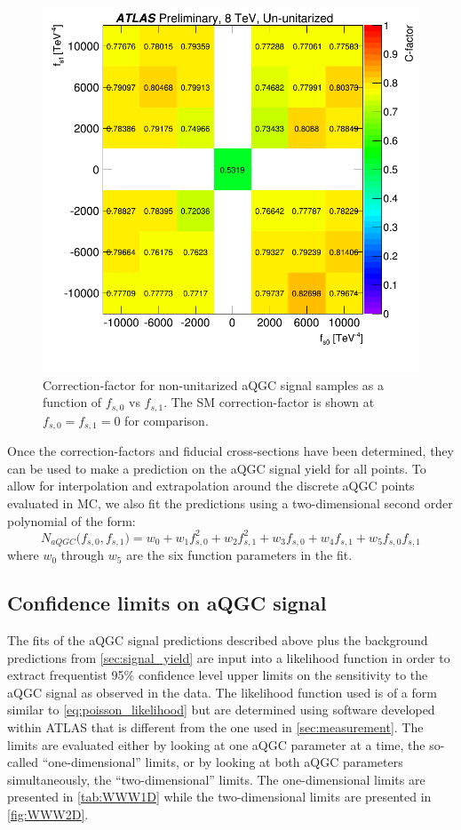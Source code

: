 \begin{figure}[ht!]
\centering
\includegraphics[width=.8\textwidth]{figures/aQGC/cfactor_chargesum.png}
\caption{Correction-factor for non-unitarized aQGC signal samples as a function of $f_{s,0}$ vs $f_{s,1}$.
The SM correction-factor is shown at $f_{s,0}=f_{s,1}=0$ for comparison.}
\label{fig:aqgc_cfactor_3l}
\end{figure}


Once the correction-factors and fiducial cross-sections have been determined,
they can be used to make a prediction on the aQGC signal yield 
for all points.  To allow for interpolation and extrapolation
around the discrete aQGC points evaluated in MC, we also 
fit the predictions using a two-dimensional second order polynomial of 
the form:
\begin{equation}
N_{aQGC}\big(f_{s,0},f_{s,1}\big) = w_0 + w_1 f_{s,0}^2 + w_2 f_{s,1}^2
+ w_3 f_{s,0} + w_4  f_{s,1} + w_5 f_{s,0} f_{s,1}
\end{equation}
where $w_0$ through $w_5$ are the six function parameters in the fit.




\subsection{Confidence limits on aQGC signal}

The fits of the aQGC signal predictions described above plus the background predictions
from \sec\ref{sec:signal_yield} are input into a likelihood function
in order to extract frequentist 95\% confidence level upper limits on the 
sensitivity to the aQGC signal as observed in the data.
The likelihood function used is of a form similar to \eqn\eqref{eq:poisson_likelihood}
but are determined using software developed within ATLAS \cite{tgclim} that is different
from the one used in \sec\ref{sec:measurement}.
The limits are evaluated either by looking at one aQGC 
parameter at a time, the so-called ``one-dimensional''
limits, or by looking at both aQGC parameters simultaneously, the 
``two-dimensional'' limits. The one-dimensional limits
are presented in \tab\ref{tab:WWW1D}
while the two-dimensional limits are presented in 
\fig\ref{fig:WWW2D}.
  
